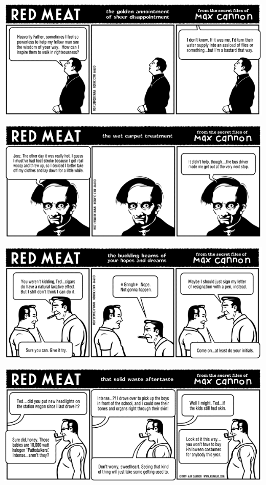 \documentclass[a4paper,twoside,11pt]{article}
\begin{document}
\includegraphics[width=\textwidth]{redmeat_1999-08-30.png}



\includegraphics[width=\textwidth]{redmeat_1999-09-06.png}



\includegraphics[width=\textwidth]{redmeat_1999-09-13.png}



\includegraphics[width=\textwidth]{redmeat_1999-09-20.png}
\end{document}
